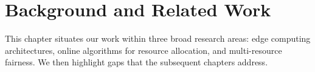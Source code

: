 \chapter{Background and Related Work}
\label{ch:background}

This chapter situates our work within three broad research areas: edge
computing architectures, online algorithms for resource allocation, and
multi-resource fairness. We then highlight gaps that the subsequent chapters
address.
